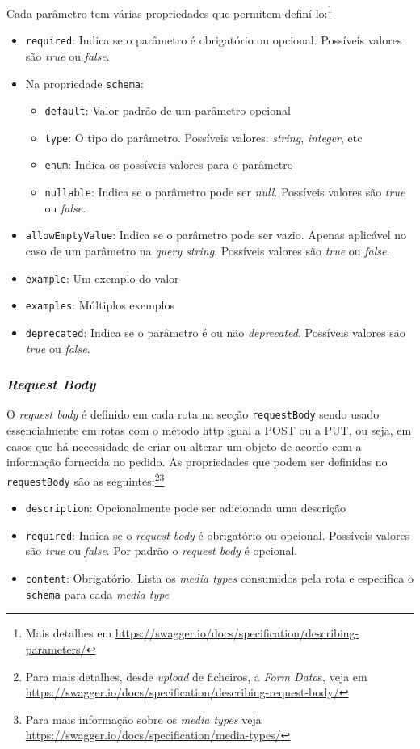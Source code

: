 Cada parâmetro tem várias propriedades que permitem definí-lo:\footnote{Mais detalhes em \url{https://swagger.io/docs/specification/describing-parameters/}}
\begin{itemize}
    \item \texttt{required}: Indica se o parâmetro é obrigatório ou opcional. Possíveis valores são \textit{true} ou \textit{false}.
    \item Na propriedade \texttt{schema}:
    \begin{itemize}
        \item \texttt{default}: Valor padrão de um parâmetro opcional
        \item \texttt{type}: O tipo do parâmetro. Possíveis valores: \textit{string}, \textit{integer}, etc
        \item \texttt{enum}: Indica os possíveis valores para o parâmetro
        \item \texttt{nullable}: Indica se o parâmetro pode ser \textit{null}. Possíveis valores são \textit{true} ou \textit{false}.
    \end{itemize}
    \item \texttt{allowEmptyValue}: Indica se o parâmetro pode ser vazio. Apenas aplicável no caso de um parâmetro na \textit{query string}. Possíveis valores são \textit{true} ou \textit{false}.
    \item \texttt{example}: Um exemplo do valor
    \item \texttt{examples}: Múltiplos exemplos
    \item \texttt{deprecated}: Indica se o parâmetro é ou não \textit{deprecated}. Possíveis valores são \textit{true} ou \textit{false}.
\end{itemize}

\subsubsection{\textit{Request Body}}
O \textit{request body} é definido em cada rota na secção \texttt{requestBody} sendo usado essencialmente em rotas com o método \acrshort{http} igual a POST ou a PUT, ou seja, em casos que há necessidade de criar ou alterar um objeto de acordo com a informação fornecida no pedido. As propriedades que podem ser definidas no \texttt{requestBody} são as seguintes:\footnote{Para mais detalhes, desde \textit{upload} de ficheiros, a \textit{Form Data}s, veja em \url{https://swagger.io/docs/specification/describing-request-body/}}\footnote{Para mais informação sobre os \textit{media types} veja \url{https://swagger.io/docs/specification/media-types/}}
\begin{itemize}
    \item \texttt{description}: Opcionalmente pode ser adicionada uma descrição
    \item \texttt{required}: Indica se o \textit{request body} é obrigatório ou opcional. Possíveis valores são \textit{true} ou \textit{false}. Por padrão o \textit{request body} é opcional.
    \item \texttt{content}: Obrigatório. Lista os \textit{media types} consumidos pela rota e especifica o \texttt{schema} para cada \textit{media type}
\end{itemize}

